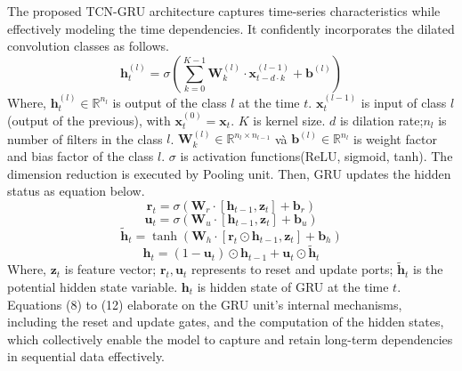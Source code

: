 \documentclass[sn-mathphys-num]{sn-jnl}%
\begin{document}
The proposed TCN-GRU architecture captures time-series characteristics while effectively modeling the time dependencies. It confidently incorporates the dilated convolution classes as follows.
     \begin{equation}
    \mathbf{h}_t^{(l)} = \sigma \left( \sum_{k=0}^{K-1} \mathbf{W}_k^{(l)} \cdot \mathbf{x}_{t-d \cdot k}^{(l-1)} + \mathbf{b}^{(l)} \right)    
    \end{equation}
Where, $\mathbf{h}_t^{(l)} \in \mathbb{R}^{n_l}$ is output of the class $l$ at the time $t$. $\mathbf{x}_t^{(l-1)}$ is input of class $l$ (output of the previous), with $\mathbf{x}_t^{(0)} = \mathbf{x}_t$. $K$ is kernel size.
    $d$ is dilation rate;$n_l$ is number of filters in the class $l$.
    $\mathbf{W}_k^{(l)} \in \mathbb{R}^{n_l \times n_{l-1}}$ và $\mathbf{b}^{(l)} \in \mathbb{R}^{n_l}$ is weight factor and bias factor of the class $l$.
    $\sigma$ is activation functions(ReLU, sigmoid, tanh). The dimension reduction is executed by Pooling unit. Then, GRU updates the hidden status as equation below. 
\begin{equation}
\mathbf{r}_t = \sigma(\mathbf{W}_r \cdot [\mathbf{h}_{t-1}, \mathbf{z}_t] + \mathbf{b}_r) 
\end{equation}
\begin{equation}
\mathbf{u}_t = \sigma(\mathbf{W}_u \cdot [\mathbf{h}_{t-1}, \mathbf{z}_t] + \mathbf{b}_u) 
\end{equation}
\begin{equation}
\tilde{\mathbf{h}}_t = \tanh(\mathbf{W}_h \cdot [\mathbf{r}_t \odot \mathbf{h}_{t-1}, \mathbf{z}_t] + \mathbf{b}_h) 
\end{equation}
\begin{equation}
\mathbf{h}_t = (1 - \mathbf{u}_t) \odot \mathbf{h}_{t-1} + \mathbf{u}_t \odot \tilde{\mathbf{h}}_t
\end{equation}
Where, $\mathbf{z}_t$ is feature vector; $\mathbf{r}_t, \mathbf{u}_t$ represents to reset and update ports; $\tilde{\mathbf{h}}_t$ is the potential hidden state variable.
$\mathbf{h}_t$ is hidden state of GRU at the time $t$.  
Equations (8) to (12) elaborate on the GRU unit’s internal mechanisms, including the reset and update gates, and the computation of the hidden states, which collectively enable the model to capture and retain long-term dependencies in sequential data effectively.
\end{document}
